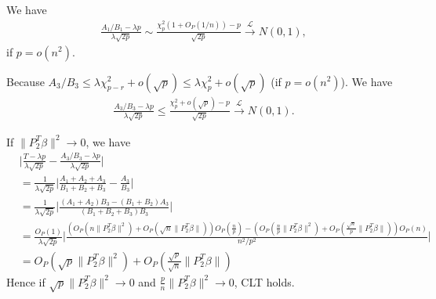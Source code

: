 \documentclass[review]{elsarticle}
\theoremstyle{plain}
\theoremstyle{definition}
\theoremstyle{remark}
\begin{document}
We have
\begin{equation}
    \begin{aligned}
        \frac{A_1/B_1-\lambda p}{\lambda\sqrt{2p}}\sim \frac{\chi^2_p (1+O_P(1/n))-p}{\sqrt{2p}}\xrightarrow{\mathcal{L}} N(0,1),
    \end{aligned}
\end{equation}
if $p=o(n^2)$.

Because $A_3/B_3\leq \lambda \chi^2_{p-r}+o(\sqrt{p})\leq \lambda \chi^2_{p}+o(\sqrt{p})$ (if $p=o(n^2)$). We have
\begin{equation}
    \begin{aligned}
        \frac{A_3/B_3-\lambda p}{\lambda\sqrt{2p}}\leq \frac{\chi^2_p +o(\sqrt{p})-p}{\sqrt{2p}}\xrightarrow{\mathcal{L}} N(0,1).
    \end{aligned}
\end{equation}

If $\|P_2^T\beta\|^2\to 0$, we have
\begin{equation}
    \begin{aligned}
        &\Big|\frac{T-{\lambda p}}{\lambda\sqrt{2p}
        }-
    \frac{A_3/B_3-{\lambda p}}{\lambda\sqrt{2p}
        }\Big|\\
        &=
        \frac{1}{\lambda\sqrt{2p}}
        \Big|
        \frac{A_1+A_2+A_3}{B_1+B_2+B_3}-\frac{A_3}{B_3}
        \Big|\\
        &=
        \frac{1}{\lambda\sqrt{2p}}
        \Big|
        \frac{(A_1+A_2)B_3-(B_1+B_2)A_3}{(B_1+B_2+B_3)B_3}
        \Big|\\
        &=
        \frac{O_{P}(1)}{\lambda\sqrt{2p}}
        \Big|
        \frac{(O_P(n\|P_2^T\beta\|^2)+O_P(\sqrt{n}\|P_2^T\beta\|))O_P(\frac{n}{p})-(O_P(\frac{n}{p}\|P_2^T\beta\|^2)+O_P(\frac{\sqrt{n}}{p}\|P_2^T\beta\|))O_P(n)}{n^2/p^2}
        \Big|\\
        &=O_P(\sqrt{p}\|P_2^T\beta\|^2)+O_P(\frac{\sqrt{p}}{\sqrt{n}}\|P_2^T\beta\|)
    \end{aligned}
\end{equation}
Hence if $\sqrt{p}\|P_2^T\beta\|^2\to 0$ and $\frac{p}{n}\|P_2^T\beta\|^2\to 0$, CLT holds.
\end{document}
